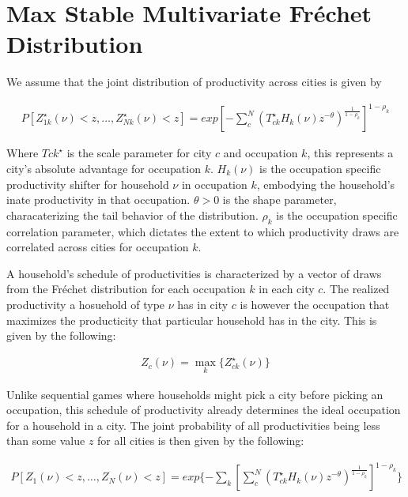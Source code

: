 \documentclass[10pt]{article}
\begin{document}


\section{Max Stable Multivariate Fréchet Distribution}

We assume that the joint distribution of productivity across cities is given by

\begin{align}
    P[Z_{1k}^{\star}(\nu) < z, \dots, Z_{Nk}^{\star}(\nu) < z] = exp[-\sum_{c}^{N}(T_{ck}^{\star} H_k(\nu) z^{-\theta})^{\frac{1}{1 - \rho_k}}]^{1 - \rho_k}
\end{align}

Where $T{ck}^{\star}$ is the scale parameter for city $c$ and occupation $k$, this represents a city's absolute advantage for occupation $k$. $H_k(\nu)$ is the occupation specific productivity shifter for household $\nu$ in occupation $k$, embodying the household's inate productivity in that occupation. $\theta > 0$ is the shape parameter, characaterizing the tail behavior of the distribution. $\rho_k$ is the occupation specific correlation parameter, which dictates the extent to which productivity draws are correlated across cities for occupation $k$.

A household's schedule of productivities is characterized by a vector of draws from the Fréchet distribution for each occupation $k$ in each city $c$. The realized productivity a hosuehold of type $\nu$ has in city $c$ is however the occupation that maximizes the producticity that particular household has in the city. This is given by the following:

\begin{align}
    Z_c(\nu) = \max_{k} \{Z_{ck}^{\star}(\nu)\}
\end{align}

Unlike sequential games where households might pick a city before picking an occupation, this schedule of productivity already determines the ideal occupation for a household in a city. The joint probability of all productivities being less than some value $z$ for all cities is then given by the following:

\begin{align}
    P[Z_1(\nu) < z, \dots, Z_N(\nu) < z] = exp\{- \sum_{k}^{}[\sum_{c}^{N}(T_{ck}^{\star} H_k(\nu) z^{-\theta})^{\frac{1}{1 - \rho_k}}]^{1 - \rho_k}\}
\end{align}
\end{document}
